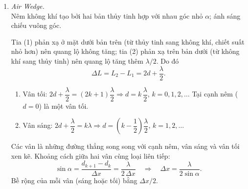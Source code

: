 \begin{enumerate}
\item \textit{Air Wedge.}\\
Nêm không khí tạo bởi hai bản thủy tinh hợp với nhau góc nhỏ $\alpha$; ánh sáng chiếu vuông góc.
\begin{figure}[htbp]
    \centering
\end{figure}
Tia (1) phản xạ ở mặt dưới bản trên (từ thủy tinh sang không khí, chiết suất nhỏ hơn) nên quang lộ không tăng; tia (2) phản xạ trên bản dưới (từ không khí sang thủy tinh) nên quang lộ tăng thêm $\lambda/2$. Do đó
\[
\Delta L = L_2 - L_1 = 2d + \frac{\lambda}{2}.
\]
\begin{enumerate}
  \item[(a)] Vân tối: $2d + \dfrac{\lambda}{2} = (2k+1)\dfrac{\lambda}{2} \Rightarrow d = k\,\dfrac{\lambda}{2}$, $k = 0, 1, 2, \dots$ Tại cạnh nêm ($d = 0$) là một vân tối.
  \item[(b)] Vân sáng: $2d + \dfrac{\lambda}{2} = k\lambda \Rightarrow d = \left(k - \dfrac12\right)\dfrac{\lambda}{2}$, $k = 1, 2, \dots$
\end{enumerate}
Các vân là những đường thẳng song song với cạnh nêm, vân sáng và vân tối xen kẽ. Khoảng cách giữa hai vân cùng loại liên tiếp:
\[
\sin\alpha = \frac{d_{k+1} - d_k}{\Delta x} = \frac{\lambda}{2\,\Delta x}
\quad\Rightarrow\quad
\boxed{\Delta x = \frac{\lambda}{2\sin\alpha}}.
\]
Bề rộng của mỗi vân (sáng hoặc tối) bằng $\Delta x/2$.


\end{enumerate}
